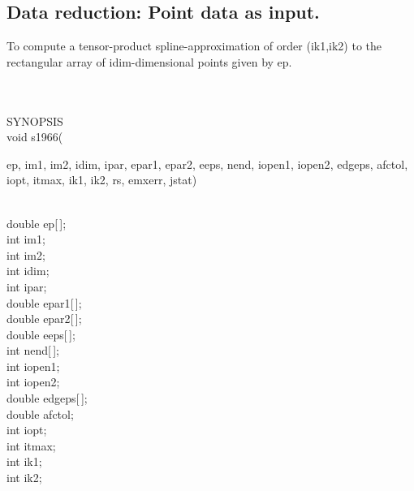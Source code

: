 \subsection{Data reduction: Point data as input.}
\begin{minipg1}
To compute a tensor-product spline-approximation of order
           (ik1,ik2) to the rectangular array of idim-dimensional
           points given by ep.
\end{minipg1} \\ \\
SYNOPSIS\\
        \> void s1966(\begin{minipg3}
            {\fov ep}, {\fov im1}, {\fov im2}, {\fov idim}, {\fov ipar}, {\fov epar1}, {\fov epar2}, {\fov eeps}, {\fov nend}, {\fov iopen1}, {\fov iopen2},
            {\fov edgeps}, {\fov afctol}, {\fov iopt}, {\fov itmax}, {\fov ik1}, {\fov ik2},
            {\fov rs}, {\fov emxerr}, {\fov jstat})
                \end{minipg3}\\
                \>\>    double \> {\fov ep}[\,];\\
                \>\>    int    \>  {\fov im1};\\
                \>\>    int    \>  {\fov im2};\\
                \>\>    int    \>  {\fov idim};\\
                \>\>    int    \>  {\fov ipar};\\
                \>\>    double \> {\fov epar1}[\,];\\
                \>\>    double \> {\fov epar2}[\,];\\
                \>\>    double \> {\fov eeps}[\,];\\
                \>\>    int    \>  {\fov nend}[\,];\\
                \>\>    int    \>  {\fov iopen1};\\
                \>\>    int    \>  {\fov iopen2};\\
                \>\>    double \> {\fov edgeps}[\,];\\
                \>\>    double \> {\fov afctol};\\
                \>\>    int    \>  {\fov iopt};\\
                \>\>    int    \>  {\fov itmax};\\
                \>\>    int    \>  {\fov ik1};\\
                \>\>    int    \>  {\fov ik2};\\
